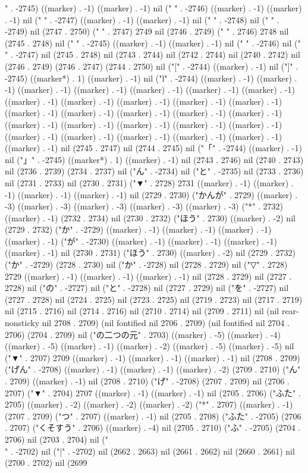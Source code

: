 " . -2745) ((marker) . -1) ((marker) . -1) nil ("
" . -2746) ((marker) . -1) ((marker) . -1) nil ("
" . -2747) ((marker) . -1) ((marker) . -1) nil (" " . -2748) nil (" " . -2749) nil (2747 . 2750) ("  " . 2747) 2749 nil (2746 . 2749) ("  " . 2746) 2748 nil (2745 . 2748) nil ("
" . -2745) ((marker) . -1) ((marker) . -1) nil (" " . -2746) nil (" " . -2747) nil (2745 . 2748) nil (2743 . 2744) nil (2742 . 2744) nil (2740 . 2742) nil (2746 . 2749) (2746 . 2747) (2744 . 2750) nil ("[" . -2744) ((marker) . -1) nil ("]" . -2745) ((marker*) . 1) ((marker) . -1) nil ("l" . -2744) ((marker) . -1) ((marker) . -1) ((marker) . -1) ((marker) . -1) ((marker) . -1) ((marker) . -1) ((marker) . -1) ((marker) . -1) ((marker) . -1) ((marker) . -1) ((marker) . -1) ((marker) . -1) ((marker) . -1) ((marker) . -1) ((marker) . -1) ((marker) . -1) ((marker) . -1) ((marker) . -1) ((marker) . -1) ((marker) . -1) ((marker) . -1) ((marker) . -1) ((marker) . -1) ((marker) . -1) ((marker) . -1) ((marker) . -1) ((marker) . -1) ((marker) . -1) nil (2745 . 2747) nil (2744 . 2745) nil ("「" . -2744) ((marker) . -1) nil ("」" . -2745) ((marker*) . 1) ((marker) . -1) nil (2743 . 2746) nil (2740 . 2743) nil (2736 . 2739) (2734 . 2737) nil ("ん" . -2734) nil ("と" . -2735) nil (2733 . 2736) nil (2731 . 2733) nil (2730 . 2731) ("▼" . 2728) 2731 ((marker) . -1) ((marker) . -1) ((marker) . -1) ((marker) . -1) nil (2729 . 2730) ("かんが" . 2729) ((marker) . -3) ((marker) . -3) ((marker) . -3) ((marker) . -3) ((marker) . -3) ("*" . 2732) ((marker) . -1) (2732 . 2734) nil (2730 . 2732) ("ほう" . 2730) ((marker) . -2) nil (2729 . 2732) ("か" . -2729) ((marker) . -1) ((marker) . -1) ((marker) . -1) ((marker) . -1) ("が" . -2730) ((marker) . -1) ((marker) . -1) ((marker) . -1) ((marker) . -1) nil (2730 . 2731) ("ほう" . 2730) ((marker) . -2) nil (2729 . 2732) ("か" . -2729) (2728 . 2730) nil ("か" . -2728) nil (2728 . 2729) nil ("▽" . 2728) 2729 ((marker) . -1) ((marker) . -1) ((marker) . -1) nil (2728 . 2729) nil (2727 . 2728) nil ("の" . -2727) nil ("と" . -2728) nil (2727 . 2729) nil ("を" . -2727) nil (2727 . 2728) nil (2724 . 2725) nil (2723 . 2725) nil (2719 . 2723) nil (2717 . 2719) nil (2715 . 2716) nil (2714 . 2716) nil (2710 . 2714) nil (2709 . 2711) nil (nil rear-nonsticky nil 2708 . 2709) (nil fontified nil 2706 . 2709) (nil fontified nil 2704 . 2706) (2704 . 2709) nil ("の二つの元" . 2703) ((marker) . -5) ((marker) . -4) ((marker) . -5) ((marker) . -1) ((marker) . -2) ((marker) . -5) ((marker) . -5) nil ("▼" . 2707) 2709 ((marker) . -1) ((marker) . -1) ((marker) . -1) nil (2708 . 2709) ("げん" . -2708) ((marker) . -1) ((marker) . -1) ((marker) . -2) (2709 . 2710) ("ん" . 2709) ((marker) . -1) nil (2708 . 2710) ("げ" . -2708) (2707 . 2709) nil (2706 . 2707) ("▼" . 2704) 2707 ((marker) . -1) ((marker) . -1) nil (2705 . 2706) ("ふた" . 2705) ((marker) . -2) ((marker) . -2) ((marker) . -2) ("*" . 2707) ((marker) . -1) (2707 . 2709) ("つ" . 2707) ((marker) . -1) nil (2705 . 2708) ("ふた" . -2705) (2706 . 2707) ("くそすう" . 2706) ((marker) . -4) nil (2705 . 2710) ("ふ" . -2705) (2704 . 2706) nil (2703 . 2704) nil ("\\" . -2702) nil ("|" . -2702) nil (2662 . 2663) nil (2661 . 2662) nil (2660 . 2661) nil (2700 . 2702) nil (2699 